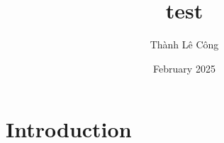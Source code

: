 \documentclass{article}
\title{test}
\author{Thành Lê Công}
\date{February 2025}
\begin{document}
\maketitle

\section{Introduction}
\end{document}
